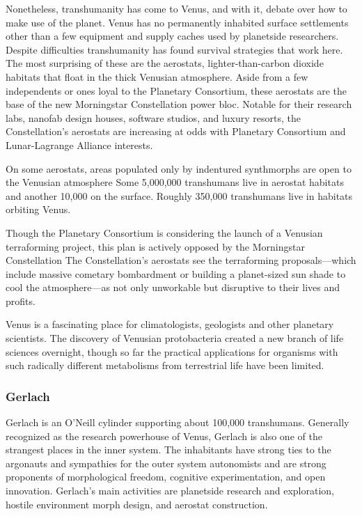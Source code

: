Nonetheless, transhumanity has come to Venus, 
and with it, debate over how to make use of the 
planet. Venus has no permanently inhabited surface 
settlements other than a few equipment and supply 
caches used by planetside researchers. Despite difficulties
transhumanity has found survival strategies
that work here. The most surprising of these are the 
aerostats, lighter-than-carbon dioxide habitats that 
float in the thick Venusian atmosphere. Aside from 
a few independents or ones loyal to the Planetary 
Consortium, these aerostats are the base of the new 
Morningstar Constellation power bloc. Notable for 
their research labs, nanofab design houses, software 
studios, and luxury resorts, the Constellation's aerostats
are increasing at odds with Planetary Consortium
and Lunar-Lagrange Alliance interests.

On some aerostats, areas populated only by indentured
synthmorphs are open to the Venusian atmosphere
Some 5,000,000 transhumans live in aerostat
habitats and another 10,000 on the surface. Roughly 
350,000 transhumans live in habitats orbiting Venus.

Though the Planetary Consortium is considering 
the launch of a Venusian terraforming project, this 
plan is actively opposed by the Morningstar Constellation
The Constellation's aerostats see the terraforming
proposals—which include massive cometary
bombardment or building a planet-sized sun shade 
to cool the atmosphere—as not only unworkable but 
disruptive to their lives and profits.

Venus is a fascinating place for climatologists, geologists
and other planetary scientists. The discovery
of Venusian protobacteria created a new branch of 
life sciences overnight, though so far the practical applications
for organisms with such radically different
metabolisms from terrestrial life have been limited.

\subsubsection{Gerlach}

Gerlach is an O'Neill cylinder supporting about 
100,000 transhumans. Generally recognized as 
the research powerhouse of Venus, Gerlach is also 
one of the strangest places in the inner system. The 
inhabitants have strong ties to the argonauts and 
sympathies for the outer system autonomists and 
are strong proponents of morphological freedom, 
cognitive experimentation, and open innovation. 
Gerlach's main activities are planetside research and 
exploration, hostile environment morph design, and 
aerostat construction.

